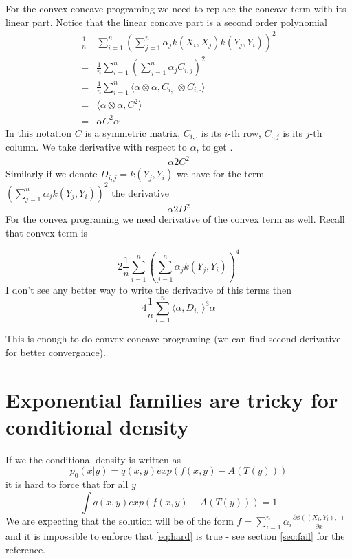 \documentclass[10pt]{article}
\begin{document}
For the convex concave programing we need to replace the concave term with its linear part. Notice that the linear concave part is a second order polynomial 
\begin{align}
  \frac 1 n & \sum_{i=1}^{n} \left(   \sum_{j=1}^{n} \alpha_j k(X_i,X_j) k(Y_j,Y_i) \right)^2  \\
  = & \frac 1 n  \sum_{i=1}^{n} \left(   \sum_{j=1}^{n} \alpha_j C_{i,j} \right)^2 \\
  = & \frac 1 n \sum_{i=1}^{n} \langle \alpha \otimes \alpha , C_{i,\cdot} \otimes C_{i,\cdot} \rangle \\
   = & \langle \alpha \otimes \alpha , C^2 \rangle \\
   = &\alpha C^2 \alpha
\end{align}
In this notation $C$ is a symmetric  matrix, $C_{i,\cdot}$ is its $i$-th row, $C_{\cdot,j}$ is its $j$-th column. We take derivative with respect to $\alpha$, to get . 
\begin{align}
\alpha 2 C^2
\end{align}
Similarly  if we denote  $D_{i,j} =    k(Y_{j},Y_i)$ we have for the term $\left( \sum_{j=1}^{n} \alpha_j    k(Y_{j},Y_i) \right )^2$ the derivative 
\[
\alpha 2 D^2 
\]
For the convex programing we need derivative of the convex  term as well. Recall that convex term is 

\[
 2\frac 1 n \sum_{i=1}^{n}  \left( \sum_{j=1}^{n} \alpha_j k(Y_j,Y_i)  \right)^4 
\]
I don't see any better way to write the derivative  of this  terms  then
\[
 4 \frac 1 n \sum_{i=1}^{n} \langle \alpha , D_{i,\cdot} \rangle^3   \alpha
\]


This is enough to do convex concave programing (we can find second derivative for better convergance). 

\section{Exponential families are tricky for conditional density}
If we the conditional density is written as 
\begin{equation}
p_0(x|y) = q(x,y)exp(f(x,y) - A(T(y)) )
\end{equation} 
it is hard to force that for all $y$
\begin{equation}
\label{eq:hard}
\int q(x,y)exp(f(x,y) - A(T(y)) )=1
\end{equation}
We are expecting that the solution will be of the form $f = \sum_{i=1}^n \alpha_i \frac{\partial  \phi( (X_i,Y_i), \cdot)} {\partial x} $ and it is impossible to enforce that \eqref{eq:hard} is true - see section \ref{sec:fail} for the reference.
\end{document}
